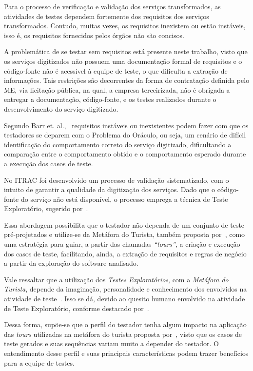 Para o processo de verificação e validação dos serviços transformados, as atividades de testes dependem fortemente dos requisitos dos serviços transformados. Contudo, muitas vezes, os requisitos inexistem ou estão instáveis, isso é, os requisitos fornecidos pelos órgãos não são concisos. 

A problemática de se testar sem requisitos está presente neste trabalho, visto que os serviços digitizados não possuem uma documentação formal de requisitos e o código-fonte não é acessível à equipe de teste, o que dificulta a extração de informações. Tais restrições são decorrentes da forma de contratação definida pelo ME, via licitação pública, na qual, a empresa terceirizada, não é obrigada a entregar a documentação, código-fonte, e os testes realizados durante o desenvolvimento do serviço digitizado. 


Segundo Barr et. al.,~\cite{barr2015oracle} requisitos instáveis ou inexistentes podem fazer com que os testadores se deparem com o Problema do Oráculo, ou seja, um cenário de difícil identificação do comportamento correto do serviço digitizado, dificultando a comparação entre o comportamento obtido e o comportamento esperado durante a execução dos casos de teste.

No ITRAC foi desenvolvido um processo de validação sistematizado, com o intuito de garantir a qualidade da digitização dos serviços. Dado que o código-fonte do serviço não está disponível, o processo emprega a técnica de Teste Exploratório, sugerido por~\cite{whittaker2009exploratory}. 

Essa abordagem possibilita que o testador não dependa de um conjunto de teste pré-projetados e utilize-se da Metáfora do Turista, também proposta por~\cite{whittaker2009exploratory}, como uma estratégia para guiar, a partir das chamadas \textit{``tours''}, a criação e execução dos casos de teste, facilitando, ainda, a extração de requisitos e regras de negócio a partir da exploração do software analisado.

Vale ressaltar que a utilização dos \textit{Testes Exploratórios}, com a  \textit{Metáfora do Turista}, depende da imaginação,  personalidade e conhecimento dos envolvidos na atividade de teste~\cite{itkonen2012role}. Isso se dá, devido ao quesito humano envolvido na atividade de Teste Exploratório, conforme destacado por~\cite{whittaker2009exploratory}.

Dessa forma, supõe-se que o perfil do testador tenha algum impacto na aplicação das \textit{tours} utilizadas na metáfora do turista proposta por~\cite{whittaker2009exploratory}, visto que os casos de teste gerados e suas sequências variam muito a depender do testador. O entendimento desse perfil e suas principais características podem trazer benefícios para a equipe de testes.


